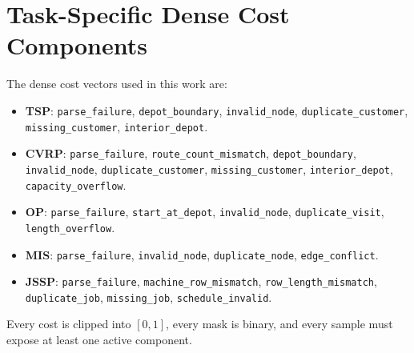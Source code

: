 \documentclass{article}
\theoremstyle{remark}
\begin{document}
\section{Task-Specific Dense Cost Components}
\label{app:costs}
The dense cost vectors used in this work are:
\sloppy
\begin{itemize}
\item \textbf{TSP}: \texttt{parse\_failure}, \texttt{depot\_boundary}, \texttt{invalid\_node}, \texttt{duplicate\_customer}, \texttt{missing\_customer}, \texttt{interior\_depot}.
\item \textbf{CVRP}: \texttt{parse\_failure}, \texttt{route\_count\_mismatch}, \texttt{depot\_boundary}, \texttt{invalid\_node}, \texttt{duplicate\_customer}, \texttt{missing\_customer}, \texttt{interior\_depot}, \texttt{capacity\_overflow}.
\item \textbf{OP}: \texttt{parse\_failure}, \texttt{start\_at\_depot}, \texttt{invalid\_node}, \texttt{duplicate\_visit}, \texttt{length\_overflow}.
\item \textbf{MIS}: \texttt{parse\_failure}, \texttt{invalid\_node}, \texttt{duplicate\_node}, \texttt{edge\_conflict}.
\item \textbf{JSSP}: \texttt{parse\_failure}, \texttt{machine\_row\_mismatch}, \texttt{row\_length\_mismatch}, \texttt{duplicate\_job}, \texttt{missing\_job}, \texttt{schedule\_invalid}.
\end{itemize}
\fussy
Every cost is clipped into \([0,1]\), every mask is binary, and every sample must expose at least one active component.
\end{document}
